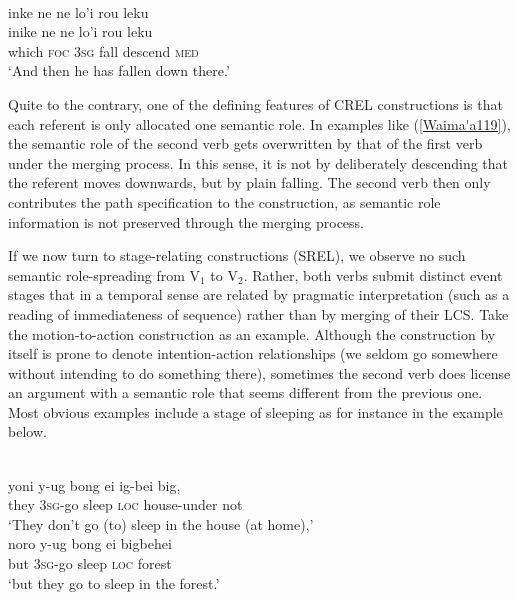 \ea \label{Waima'a119}
\\
\glll inke ne ne lo'i rou leku \\
inike ne ne lo'i rou leku \\
which \textsc{foc} \textsc{3}\textsc{sg} fall descend \textsc{med} \\
\glft `And then he has fallen down there.' \\ 
\z

Quite to the contrary, one of the defining features of CREL constructions is that each referent is only allocated one semantic role. In examples like (\ref{Waima'a119}), the semantic role of the second verb gets overwritten by that of the first verb under the merging process. In this sense, it is not by deliberately descending that the referent moves downwards, but by plain falling. The second verb then only contributes the path specification to the construction, as semantic role information is not preserved through the merging process.
 
If we now turn to stage-relating constructions (SREL), we observe no such semantic role-spreading from V$_1$ to V$_2$. Rather, both verbs submit distinct event stages that in a temporal sense are related by pragmatic interpretation (such as a reading of immediateness of sequence) rather than by merging of their LCS. Take the motion-to-action construction as an example. Although the construction by itself is prone to denote intention-action relationships (we seldom go somewhere without intending to do something there), sometimes the second verb does license an argument with a semantic role that seems different from the previous one. Most obvious examples include a stage of sleeping as for instance in the  example below.

\ea \label{Hatam6465}
\\
\ea
\gll yoni y-ug bong ei ig-bei big, \\
they \textsc{3}\textsc{sg}-go sleep \textsc{loc} house-under not \\
\glft `They don't go (to) sleep in the house (at home),' \\ 
\ex
\gll noro y-ug bong ei bigbehei \\ 
but \textsc{3}\textsc{sg}-go sleep \textsc{loc} forest \\
\glft `but they go to sleep in the forest.' \\ 
\z
\z

